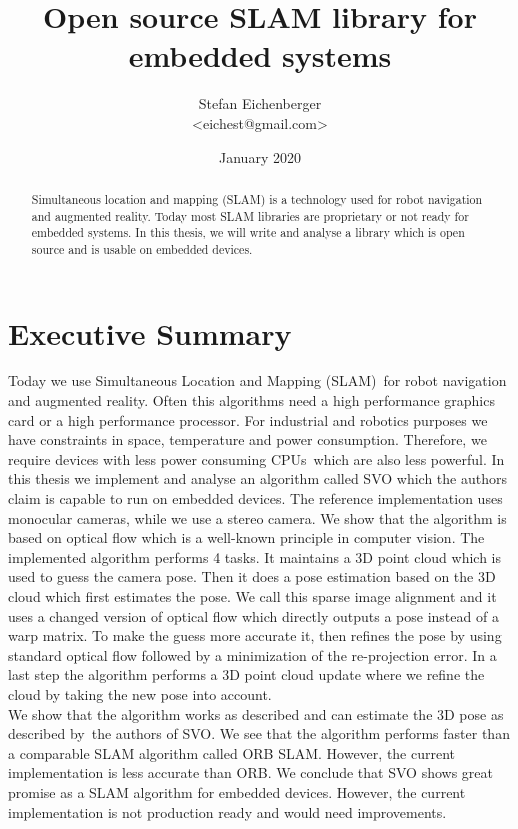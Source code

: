 \documentclass[11pt,a4paper,titlepage,oneside]{report}
\title{Open source SLAM library for embedded systems}
\author{Stefan Eichenberger\\<eichest@gmail.com>}
\date{January 2020}
\begin{document}
\maketitle
\begin{abstract}
	Simultaneous location and mapping (SLAM) is a technology used for robot navigation and augmented reality. Today most SLAM libraries are proprietary or not ready for embedded systems. In this thesis, we will write and analyse a library which is open source and is usable on embedded devices.
\end{abstract}

\section*{Executive Summary}
Today we use Simultaneous Location and Mapping (SLAM) for robot navigation and augmented reality. Often this algorithms need a high performance graphics card or a high performance processor. For industrial and robotics purposes we have constraints in space, temperature and power consumption. Therefore, we require devices with less power consuming CPUs which are also less powerful. In this thesis we implement and analyse an algorithm called SVO which the authors claim is capable to run on embedded devices. The reference implementation uses monocular cameras, while we use a stereo camera. We show that the algorithm is based on optical flow which is a well-known principle in computer vision. The implemented algorithm performs 4 tasks. It maintains a 3D point cloud which is used to guess the camera pose. Then it does a pose estimation based on the 3D cloud which first estimates the pose. We call this sparse image alignment and it uses a changed version of optical flow which directly outputs a pose instead of a warp matrix. To make the guess more accurate it, then refines the pose by using standard optical flow followed by a minimization of the re-projection error. In a last step the algorithm performs a 3D point cloud update where we refine the cloud by taking the new pose into account.\\
We show that the algorithm works as described and can estimate the 3D pose as described by the authors of SVO. We see that the algorithm performs faster than a comparable SLAM algorithm called ORB SLAM. However, the current implementation is less accurate than ORB. We conclude that SVO shows great promise as a SLAM algorithm for embedded devices. However, the current implementation is not production ready and would need improvements.
\end{document}
